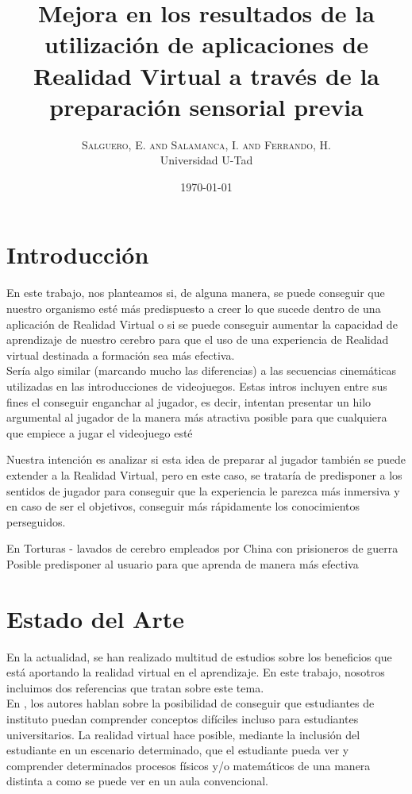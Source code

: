 \documentclass[twoside,twocolumn]{article}
\title{Mejora en los resultados de la utilización de aplicaciones de Realidad Virtual a través de la preparación sensorial previa} %
\author{%
\textsc{Salguero, E. and Salamanca, I. and Ferrando, H.} \\%
\normalsize Universidad U-Tad \\ %
}
\date{\today} %
\begin{document}
\fancyhead{} %

\maketitle

\section{Introducción}
En este trabajo, nos planteamos si, de alguna manera, se puede conseguir que nuestro organismo esté más predispuesto a creer lo que sucede dentro de una aplicación de Realidad Virtual o si se puede conseguir aumentar la capacidad de aprendizaje de nuestro cerebro para que el uso de una experiencia de Realidad virtual destinada a formación sea más efectiva.\\

Sería algo similar (marcando mucho las diferencias) a las secuencias cinemáticas utilizadas en las introducciones de videojuegos. Estas intros incluyen entre sus fines el conseguir enganchar al jugador, es decir, intentan presentar un hilo argumental al jugador de la manera más atractiva posible para que cualquiera que empiece a jugar el videojuego esté

Nuestra intención es analizar si esta idea de preparar al jugador también se puede extender a la Realidad Virtual, pero en este caso, se trataría de predisponer a los sentidos de jugador para conseguir que la experiencia le parezca más inmersiva y en caso de ser el objetivos, conseguir más rápidamente los conocimientos perseguidos. 

En \cite{PrivacionSensorial} 
\noindent Torturas - lavados de cerebro empleados por China con prisioneros de guerra\\

\noindent Posible predisponer al usuario para que aprenda de manera más efectiva\\

\section{Estado del Arte}
En la actualidad, se han realizado multitud de estudios sobre los beneficios que está aportando la realidad virtual en el aprendizaje. En este trabajo, nosotros incluimos dos referencias que tratan sobre este tema.\\

En \cite{ScienceSpace}, los autores hablan sobre la posibilidad de conseguir que estudiantes de instituto puedan comprender conceptos difíciles incluso para estudiantes universitarios. La realidad virtual hace posible, mediante la inclusión del estudiante en un escenario determinado, que el estudiante pueda ver y comprender determinados procesos físicos y/o matemáticos de una manera distinta a como se puede ver en un aula convencional.\\
\end{document}
